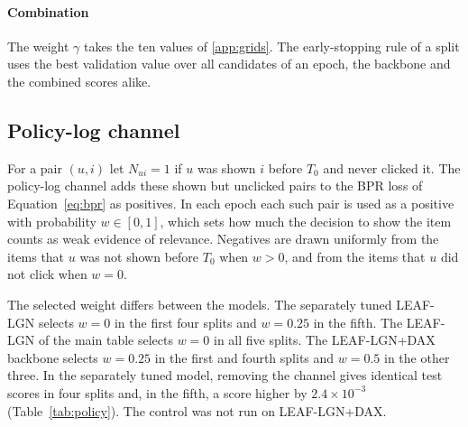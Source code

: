 \documentclass[preprint,12pt,authoryear]{elsarticle}
\begin{document}
\paragraph{Combination} The weight $\gamma$ takes the ten values of \ref{app:grids}. The early-stopping rule of a split uses the best validation
value over all candidates of an epoch, the backbone and the combined scores alike.

\subsection{Policy-log channel}\label{app:policy}

For a pair $(u,i)$ let $N_{ui}=1$ if $u$ was shown $i$ before $T_0$ and never clicked it. The policy-log channel adds these shown but unclicked pairs to the
BPR loss of Equation~\eqref{eq:bpr} as positives. In each epoch each such pair is used as a positive with probability $w\in[0,1]$, which sets how much the
decision to show the item counts as weak evidence of relevance. Negatives are drawn uniformly from the items that $u$ was not shown before $T_0$ when
$w>0$, and from the items that $u$ did not click when $w=0$.

The selected weight differs between the models. The separately tuned LEAF-LGN selects $w=0$ in the first four splits and $w=0.25$ in the fifth. The
LEAF-LGN of the main table selects $w=0$ in all five splits. The LEAF-LGN+DAX backbone selects $w=0.25$ in the first and fourth splits and $w=0.5$
in the other three. In the separately tuned model, removing the channel gives identical test scores in four splits and, in the fifth, a score higher by
$2.4\times10^{-3}$ (Table~\ref{tab:policy}). The control was not run on LEAF-LGN+DAX.
\end{document}
